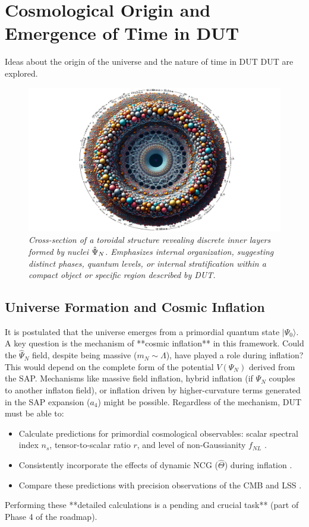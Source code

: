 \documentclass[11pt, a4paper]{article}
\theoremstyle{remark}
\newcommand{\Op}[1]{\hat{#1}}
\begin{document}
\section{Cosmological Origin and Emergence of Time in DUT}
\label{sec:cosmo_origin_final}

Ideas about the origin of the universe and the nature of time in DUT DUT are explored.

\begin{figure}[htbp]
    \centering
    \includegraphics[width=0.6\linewidth]{OIG2.ZNLJ.PNG}
    \caption{%
        \footnotesize\textit{Cross-section of a toroidal structure revealing discrete inner layers formed by nuclei \(\protect\Op{\Psi}_N\). Emphasizes internal organization, suggesting distinct phases, quantum levels, or internal stratification within a compact object or specific region described by DUT.}
    }
    \label{fig:Figura11}
\end{figure}

\subsection{Universe Formation and Cosmic Inflation}
\label{subsec:universe_formation_inflation_final_revised}
It is postulated that the universe emerges from a primordial quantum state \(|\Psi_0\rangle\). A key question is the mechanism of **cosmic inflation** \citep{Guth:1980zm, Linde:1981mu, Albrecht:1982wi, Starobinsky1980} in this framework. Could the \( \Op{\Psi}_N \) field, despite being massive (\( m_N \sim \Lambda \)), have played a role during inflation? This would depend on the complete form of the potential \( V(\Psi_N) \) derived from the SAP. Mechanisms like massive field inflation, hybrid inflation (if \( \Psi_N \) couples to another inflaton field), or inflation driven by higher-curvature terms generated in the SAP expansion (\( a_4 \)) might be possible.
Regardless of the mechanism, DUT must be able to:
\begin{itemize}
    \item Calculate predictions for primordial cosmological observables: scalar spectral index \( n_s \), tensor-to-scalar ratio \( r \), and level of non-Gaussianity \( f_{NL} \) \citep{Maldacena2003NonGaussian}.
    \item Consistently incorporate the effects of dynamic NCG (\( \Op{\Theta} \)) during inflation \citep[cf.][]{Aschieri2022}.
    \item Compare these predictions with precision observations of the CMB and LSS \citep{Planck2018Inflation, Planck2018NonGaussianity, BICEP:2021xfz}.
\end{itemize}
Performing these **detailed calculations is a pending and crucial task** (part of Phase 4 of the roadmap).
\end{document}
